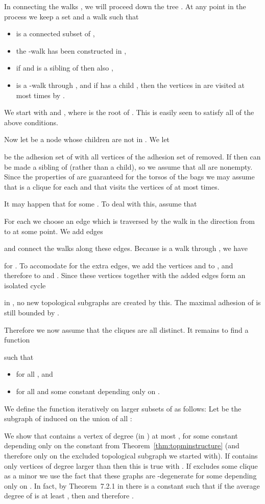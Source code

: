 \documentclass[12pt]{amsart}
\begin{document}
In connecting the walks , we will proceed down the tree
. At any point in the process we keep a set 
and a walk  such that
\begin{itemize}
\item  is a connected subset of ,
\item the -walk has been constructed in ,
\item if  and  is a sibling of  then also ,
\item  is a -walk through , and if
   has a child , then the vertices in  are visited at most  times by .
\end{itemize}
We start with  and , where  is the root of
. This is easily seen to satisfy all of the above conditions.

Now let  be a node whose children  are not
in . We let

be the adhesion set of  with all vertices of the adhesion set of
 removed. If  then  can be made a sibling of
 (rather than a child), so we assume that all  are
nonempty. Since the properties of  are guaranteed for
the torsos of the bags we may assume that  is a clique for
each  and that  visits the vertices of  at most 
times.

It may happen that  for some . To deal with
this, assume that

For each  we choose an edge 
which is traversed by the walk  in the direction from 
to  at some point. We add edges

and connect the walks  along these
edges. Because  is a walk through , we have

for . To accomodate for the extra edges, we add the
vertices  and  to , and therefore to 
and . Since these vertices together with the added edges form an
isolated cycle

in , no new topological subgraphs are created by this. The
maximal adhesion of  is still bounded by .

Therefore we now assume that the cliques  are all
distinct. It remains to find a function

such that
\begin{itemize}
\item  for all , and
\item  for all  and some constant
   depending only on .
\end{itemize}

We define the function  iteratively on larger subsets of  as
follows: Let  be the subgraph of  induced on the union of
all :

We show that  contains a vertex of degree (in ) at
most , for some constant  depending only on the constant 
from Theorem~\ref{thm:topminstructure} (and therefore only on the
excluded topological subgraph  we started with). If 
contains only  vertices of degree larger than  then this is true
with . If  excludes some clique  as a minor we use
the fact that these graphs are -degenerate for some  depending
only on . In fact, by Theorem~7.2.1 in \cite{diestel} there is a
constant  such that if the average degree of  is at least
, then  and therefore .
\end{document}

